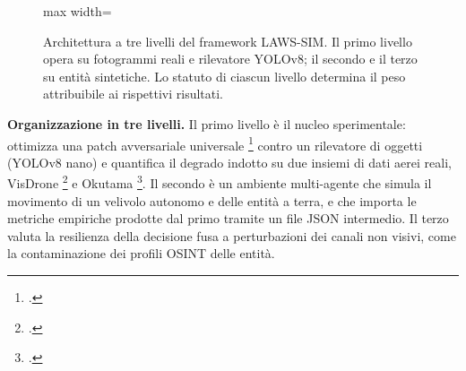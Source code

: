 \ifstampa\documentclass[a4paper,12pt,twoside,openright]{report}\else\documentclass[a4paper,12pt]{report}\fi
\newif\ifrevisione \revisionefalse
\DeclareRobustCommand{\rev}[1]{\ifrevisione{\color{blue!65!black}#1}\else#1\fi}
\begin{document}
\begin{figure}[htbp]
\centering
\begin{adjustbox}{max width=\textwidth}
\end{adjustbox}
\caption[Architettura a tre livelli del framework LAWS-SIM]{Architettura a
tre livelli del framework LAWS-SIM. Il primo livello opera su fotogrammi reali e
rilevatore YOLOv8; il secondo e il terzo su entità sintetiche. Lo statuto di
ciascun livello determina il peso attribuibile ai rispettivi risultati.}
\label{fig:tre_livelli}
\end{figure}

\textbf{Organizzazione in tre livelli.}
\label{sec:tre_layer}
Il primo livello è il nucleo sperimentale: ottimizza una patch avversariale
universale \footcite{brown_2017_patch,thys_2019} contro un rilevatore di oggetti
(YOLOv8 nano) e quantifica il degrado indotto su due \rev{insiemi di dati} aerei reali,
VisDrone \footcite{zhu_2021_visdrone} e Okutama
\footcite{barekatain_2017_okutama}. Il secondo è un ambiente multi-agente che
simula il movimento di un velivolo autonomo e delle entità a terra, e che
importa le metriche empiriche prodotte dal primo tramite un file JSON
intermedio. Il terzo valuta la resilienza della decisione fusa a perturbazioni
dei canali non visivi, come la contaminazione dei profili OSINT delle entità.
\end{document}
